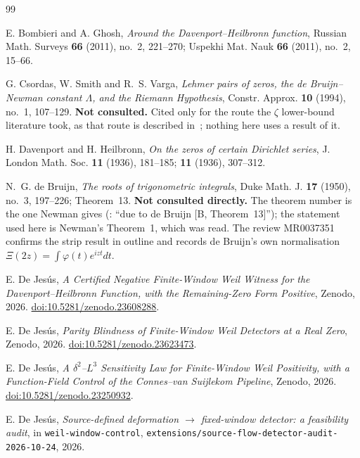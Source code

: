 \documentclass[11pt,a4paper]{article}
\theoremstyle{remark}
\begin{document}
\begin{thebibliography}{99}

 E. Bombieri and A. Ghosh,
\emph{Around the Davenport--Heilbronn function},
Russian Math. Surveys \textbf{66} (2011), no.~2, 221--270;
Uspekhi Mat. Nauk \textbf{66} (2011), no.~2, 15--66.

 G. Csordas, W. Smith and R.~S. Varga,
\emph{Lehmer pairs of zeros, the de Bruijn--Newman constant $\Lambda$, and the Riemann
Hypothesis}, Constr. Approx. \textbf{10} (1994), no.~1, 107--129.
\textbf{Not consulted.} Cited only for the route the $\zeta$ lower-bound literature took,
as that route is described in~\cite[\S2.6]{NW}; nothing here uses a result of it.

 H. Davenport and H. Heilbronn,
\emph{On the zeros of certain Dirichlet series},
J. London Math. Soc. \textbf{11} (1936), 181--185; \textbf{11} (1936), 307--312.

 N.~G. de Bruijn,
\emph{The roots of trigonometric integrals},
Duke Math. J. \textbf{17} (1950), no.~3, 197--226; Theorem~13.
\textbf{Not consulted directly.} The theorem number is the one Newman gives
(\cite[p.~246]{Ne76}: ``due to de Bruijn [B, Theorem~13]''); the statement used here is
Newman's Theorem~1, which was read. The review MR0037351 confirms the strip result in
outline and records de Bruijn's own normalisation $\Xi(2z)=\int\varphi(t)e^{izt}dt$.

 E. De Jes\'us,
\emph{A Certified Negative Finite-Window Weil Witness for the Davenport--Heilbronn
Function, with the Remaining-Zero Form Positive}, Zenodo, 2026.
\href{https://doi.org/10.5281/zenodo.23608288}{doi:10.5281/zenodo.23608288}.

 E. De Jes\'us,
\emph{Parity Blindness of Finite-Window Weil Detectors at a Real Zero}, Zenodo, 2026.
\href{https://doi.org/10.5281/zenodo.23623473}{doi:10.5281/zenodo.23623473}.

 E. De Jes\'us,
\emph{A $\delta^2$--$L^3$ Sensitivity Law for Finite-Window Weil Positivity, with a
Function-Field Control of the Connes--van Suijlekom Pipeline}, Zenodo, 2026.
\href{https://doi.org/10.5281/zenodo.23250932}{doi:10.5281/zenodo.23250932}.

 E. De Jes\'us,
\emph{Source-defined deformation $\to$ fixed-window detector: a feasibility audit},
in \texttt{weil-window-control}, \texttt{extensions/source-flow-detector-audit-2026-10-24},
2026.


\end{thebibliography}
\end{document}
